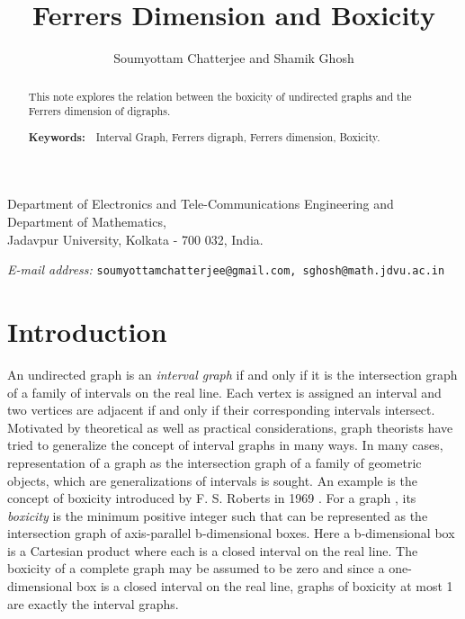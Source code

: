 \documentclass[11pt]{article}
\title{\Large\bf Ferrers Dimension and Boxicity}
\author{Soumyottam Chatterjee and Shamik Ghosh}
\renewcommand{\baselinestretch}{1.25}
\theoremstyle{definition}
\theoremstyle{remark}
\numberwithin{equation}{section}
\newcommand{\address}[1]
 { \vspace{-2em}\begin{center}
  \footnotesize{#1}
   \end{center}}
\newcommand{\email}[1]
   {\vspace{-2em} \begin{center}
   \footnotesize{{\it E-mail address:} \texttt{#1}}
   \end{center}}
\begin{document}
\maketitle

\vspace{-0.5em}
\address{Department of Electronics and Tele-Communications Engineering and Department of Mathematics,\\
Jadavpur University,
Kolkata - 700 032, India.}

\vspace{0.25em}
\email{soumyottamchatterjee@gmail.com, sghosh@math.jdvu.ac.in}



\renewcommand{\baselinestretch}{1}
\begin{abstract}
This note explores the relation between the boxicity of undirected graphs and the Ferrers dimension of digraphs.

\vspace{0.5em}\noindent
{\footnotesize {\bf Keywords:}\ \ Interval Graph, Ferrers digraph, Ferrers dimension, Boxicity.}
\end{abstract}



\renewcommand{\baselinestretch}{1.25}



\section{Introduction}

An undirected graph  is an {\em interval graph} if and only if it is the intersection graph of a family of intervals on the real line. Each vertex is assigned an interval and two vertices are adjacent if and only if their corresponding intervals intersect. Motivated by theoretical as well as practical considerations, graph theorists have tried to generalize the concept of interval graphs in many ways. In many cases, representation of a graph as the intersection graph of a family of geometric objects, which are generalizations of intervals is sought. An example is the concept of boxicity introduced by F. S. Roberts in 1969 \cite{F}. For a graph , its {\em boxicity}  is the minimum positive integer  such that  can be represented as the intersection graph of axis-parallel b-dimensional boxes. Here a b-dimensional box is a Cartesian product  where each  is a closed interval on the real line. The boxicity of a complete graph may be assumed to be zero and since a one-dimensional box is a closed interval on the real line, graphs of boxicity at most 1 are exactly the interval graphs.
\end{document}
